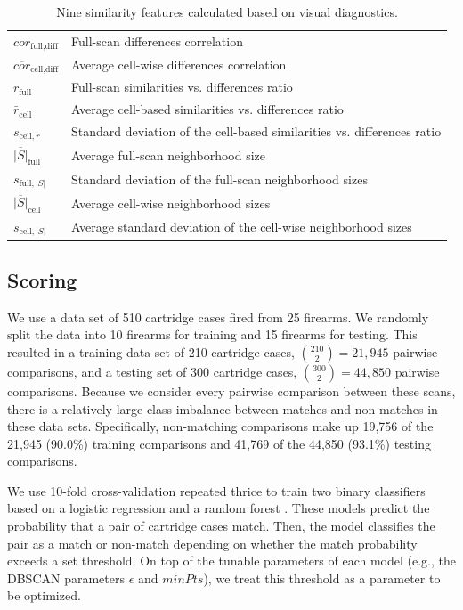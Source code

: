 \documentclass[11pt,]{isuthesis}
\begin{document}
\begin{table}

\caption{\label{tab:visualDiagnosticFeatures-latex}Nine similarity features calculated based on visual diagnostics.}
\centering
\begin{tabu} to 
\toprule
$cor_{\text{full},\text{diff}}$ & Full-scan differences correlation\\
$\overline{cor}_{\text{cell},\text{diff}}$ & Average cell-wise differences correlation\\
$r_{\text{full}}$ & Full-scan similarities vs. differences ratio\\
$\bar{r}_{\text{cell}}$ & Average cell-based similarities vs. differences ratio\\
$s_{\text{cell}, r}$ & Standard deviation of the cell-based similarities vs. differences ratio\\
$\overline{|S|}_{\text{full}}$ & Average full-scan neighborhood size\\
$s_{\text{full},|S|}$ & Standard deviation of the full-scan neighborhood sizes\\
$\overline{|S|}_{\text{cell}}$ & Average cell-wise neighborhood sizes\\
$\bar{s}_{\text{cell},|S|}$ & Average standard deviation of the cell-wise neighborhood sizes\\
\bottomrule
\end{tabu}
\end{table}

\hypertarget{scoring}{%
\subsection{Scoring}\label{scoring}}

We use a data set of 510 cartridge cases fired from 25 firearms.
We randomly split the data into 10 firearms for training and 15 firearms for testing.
This resulted in a training data set of 210 cartridge cases, \(\binom{210}{2} = 21,945\) pairwise comparisons, and a testing set of 300 cartridge cases, \(\binom{300}{2} = 44,850\) pairwise comparisons.
Because we consider every pairwise comparison between these scans, there is a relatively large class imbalance between matches and non-matches in these data sets.
Specifically, non-matching comparisons make up 19,756 of the 21,945 (90.0\%) training comparisons and 41,769 of the 44,850 (93.1\%) testing comparisons.

We use 10-fold cross-validation repeated thrice \citep{caret} to train two binary classifiers based on a logistic regression and a random forest \citep{breiman, randomForest}.
These models predict the probability that a pair of cartridge cases match.
Then, the model classifies the pair as a match or non-match depending on whether the match probability exceeds a set threshold.
On top of the tunable parameters of each model (e.g., the DBSCAN parameters \(\epsilon\) and \(minPts\)), we treat this threshold as a parameter to be optimized.
\end{document}
